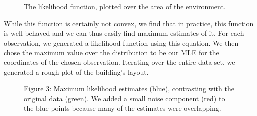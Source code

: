 \begin{figure}
\caption{The likelihood function, plotted over the area of the environment.}
\end{figure}

While this function is certainly not convex, we find that in practice, this 
function is well behaved and we can thus easily find maximum estimates of it.
For each observation, we generated a likelihood function using this equation.
We then chose the maximum value over the
distribution to be our MLE for the coordinates of the chosen
observation. Iterating over the entire data set, we generated a rough
plot of the building's layout.
\begin{figure}
\caption{Figure 3: Maximum likelihood estimates (blue), contrasting with the
original data (green). We added a small noise component (red) to the
blue points because many of the estimates were overlapping.}
\end{figure}

